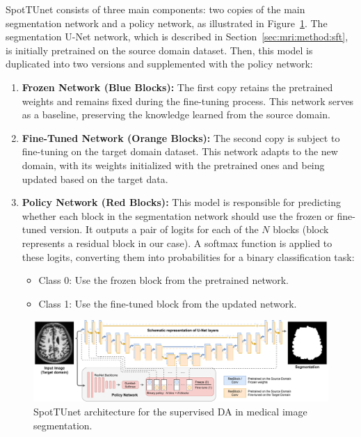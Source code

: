 SpotTUnet consists of three main components: two copies of the main segmentation network and a policy network, as illustrated in Figure~\ref{fig:spottune_seg}. The segmentation  U-Net network, which is described in Section~\ref{sec:mri:method:sft}, is initially pretrained on the source domain dataset. Then, this model is duplicated into two versions and supplemented with the policy network:

\begin{enumerate}
	
	\item \textbf{Frozen Network (Blue Blocks):} The first copy retains the pretrained weights and remains fixed during the fine-tuning process. This network serves as a baseline, preserving the knowledge learned from the source domain.
	
	\item \textbf{Fine-Tuned Network (Orange Blocks):} The second copy is subject to fine-tuning on the target domain dataset. This network adapts to the new domain, with its weights initialized with the pretrained ones and being updated based on the target data.
	
	\item \textbf{Policy Network (Red Blocks):} This model is responsible for predicting whether each block in the segmentation network should use the frozen or fine-tuned version. It outputs a pair of logits for each of the $N$ blocks (block represents a residual block in our case). A softmax function is applied to these logits, converting them into probabilities for a binary classification task:
	\begin{itemize}
		\item Class 0: Use the frozen block from the pretrained network.
		\item Class 1: Use the fine-tuned block from the updated network.
	\end{itemize}
	
\end{enumerate}


\begin{landscape}
\begin{figure}[p]
	\centering
	\includegraphics[width=\linewidth]{Dissertation/Figures/2_mri/spottune_seg.pdf}
	\caption{SpotTUnet architecture for the supervised DA in medical image segmentation.}%
	\label{fig:spottune_seg}
\end{figure}
\end{landscape}



